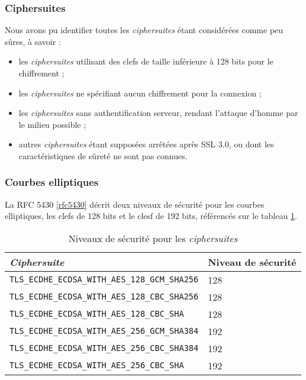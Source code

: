 \subsubsection{Ciphersuites}
Nous avons pu identifier toutes les \textit{ciphersuites} étant considérées comme peu sûres, à savoir :
\begin{itemize}
\item les \textit{ciphersuites} utilisant des clefs de taille inférieure à 128 bits pour le chiffrement ;
\item les \textit{ciphersuites} ne spécifiant aucun chiffrement pour la connexion ; 
\item les \textit{ciphersuites} sans authentification serveur, rendant l'attaque d'homme par le milieu possible ;
\item autres \textit{ciphersuites} étant supposées arrêtées après SSL 3.0, ou dont les caractéristiques de sûreté ne sont pas connues.
\end{itemize}


\subsubsection{Courbes elliptiques}
La RFC 5430 \ref{rfc5430} décrit deux niveaux de sécurité pour les courbes elliptiques, les clefs de 128 bits et le clesf de 192 bits, référencés sur le tableau \ref{ciphsuiteSec}. 

\begin{table}[H]
\centering

\begin{tabularx}{13cm}{|l|X|}
\hline
\textbf{\textit{Ciphersuite}} & \textbf{Niveau de sécurité} \\
\hline
\verb+TLS_ECDHE_ECDSA_WITH_AES_128_GCM_SHA256+ & 128\\
\verb+TLS_ECDHE_ECDSA_WITH_AES_128_CBC_SHA256+ & 128\\            
\verb+TLS_ECDHE_ECDSA_WITH_AES_128_CBC_SHA+    & 128\\            
\verb+TLS_ECDHE_ECDSA_WITH_AES_256_GCM_SHA384+ & 192\\            
\verb+TLS_ECDHE_ECDSA_WITH_AES_256_CBC_SHA384+ & 192\\            
\verb+TLS_ECDHE_ECDSA_WITH_AES_256_CBC_SHA+    & 192\\
\hline
\end{tabularx}

\caption{Niveaux de sécurité pour les \textit{ciphersuites}}
\label{ciphsuiteSec}
\end{table}


